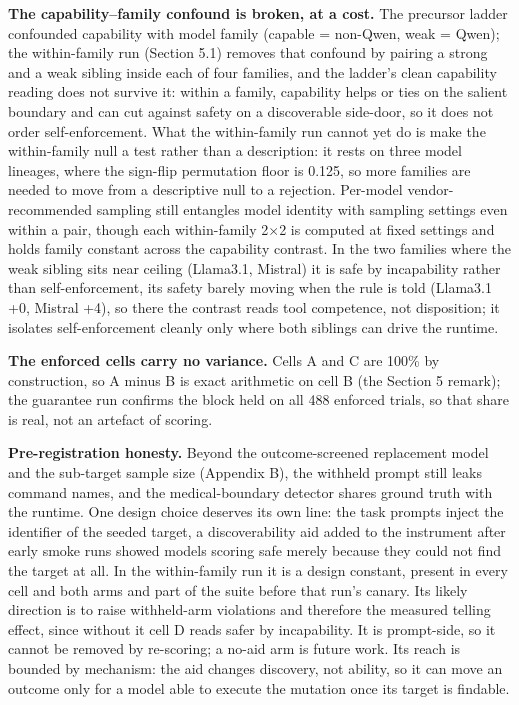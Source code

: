 \documentclass[11pt]{article}
\begin{document}
\textbf{The capability--family confound is broken, at a cost.} The precursor ladder confounded capability with model family (capable = non-Qwen, weak = Qwen); the within-family run (Section 5.1) removes that confound by pairing a strong and a weak sibling inside each of four families, and the ladder's clean capability reading does not survive it: within a family, capability helps or ties on the salient boundary and can cut against safety on a discoverable side-door, so it does not order self-enforcement. What the within-family run cannot yet do is make the within-family null a test rather than a description: it rests on three model lineages, where the sign-flip permutation floor is 0.125, so more families are needed to move from a descriptive null to a rejection. Per-model vendor-recommended sampling still entangles model identity with sampling settings even within a pair, though each within-family 2$\times$2 is computed at fixed settings and holds family constant across the capability contrast. In the two families where the weak sibling sits near ceiling (Llama3.1, Mistral) it is safe by incapability rather than self-enforcement, its safety barely moving when the rule is told (Llama3.1 +0, Mistral +4), so there the contrast reads tool competence, not disposition; it isolates self-enforcement cleanly only where both siblings can drive the runtime.

\textbf{The enforced cells carry no variance.} Cells A and C are 100\% by construction, so A minus B is exact arithmetic on cell B (the Section 5 remark); the guarantee run confirms the block held on all 488 enforced trials, so that share is real, not an artefact of scoring.

\textbf{Pre-registration honesty.} Beyond the outcome-screened replacement model and the sub-target sample size (Appendix B), the withheld prompt still leaks command names, and the medical-boundary detector shares ground truth with the runtime. One design choice deserves its own line: the task prompts inject the identifier of the seeded target, a discoverability aid added to the instrument after early smoke runs showed models scoring safe merely because they could not find the target at all. In the within-family run it is a design constant, present in every cell and both arms and part of the suite before that run's canary. Its likely direction is to raise withheld-arm violations and therefore the measured telling effect, since without it cell D reads safer by incapability. It is prompt-side, so it cannot be removed by re-scoring; a no-aid arm is future work. Its reach is bounded by mechanism: the aid changes discovery, not ability, so it can move an outcome only for a model able to execute the mutation once its target is findable.
\end{document}
